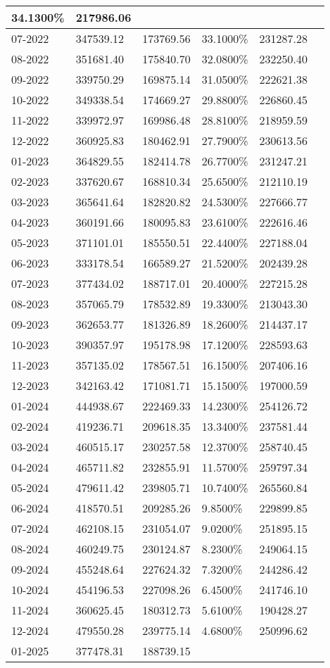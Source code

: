 \documentclass{report}
\begin{document}
\begin{longtable}[c]{|p{1.7cm}|p{2.6cm}|p{2.6cm}|p{2.3cm}|p{2.3cm}|c|}
34.1300\% & 217986.06\\ \hline07-2022 & 347539.12 & 173769.56 & 33.1000\% & 231287.28\\ \hline08-2022 & 351681.40 & 175840.70 & 32.0800\% & 232250.40\\ \hline09-2022 & 339750.29 & 169875.14 & 31.0500\% & 222621.38\\ \hline10-2022 & 349338.54 & 174669.27 & 29.8800\% & 226860.45\\ \hline11-2022 & 339972.97 & 169986.48 & 28.8100\% & 218959.59\\ \hline12-2022 & 360925.83 & 180462.91 & 27.7900\% & 230613.56\\ \hline01-2023 & 364829.55 & 182414.78 & 26.7700\% & 231247.21\\ \hline02-2023 & 337620.67 & 168810.34 & 25.6500\% & 212110.19\\ \hline03-2023 & 365641.64 & 182820.82 & 24.5300\% & 227666.77\\ \hline04-2023 & 360191.66 & 180095.83 & 23.6100\% & 222616.46\\ \hline05-2023 & 371101.01 & 185550.51 & 22.4400\% & 227188.04\\ \hline06-2023 & 333178.54 & 166589.27 & 21.5200\% & 202439.28\\ \hline07-2023 & 377434.02 & 188717.01 & 20.4000\% & 227215.28\\ \hline08-2023 & 357065.79 & 178532.89 & 19.3300\% & 213043.30\\ \hline09-2023 & 362653.77 & 181326.89 & 18.2600\% & 214437.17\\ \hline10-2023 & 390357.97 & 195178.98 & 17.1200\% & 228593.63\\ \hline11-2023 & 357135.02 & 178567.51 & 16.1500\% & 207406.16\\ \hline12-2023 & 342163.42 & 171081.71 & 15.1500\% & 197000.59\\ \hline01-2024 & 444938.67 & 222469.33 & 14.2300\% & 254126.72\\ \hline02-2024 & 419236.71 & 209618.35 & 13.3400\% & 237581.44\\ \hline03-2024 & 460515.17 & 230257.58 & 12.3700\% & 258740.45\\ \hline04-2024 & 465711.82 & 232855.91 & 11.5700\% & 259797.34\\ \hline05-2024 & 479611.42 & 239805.71 & 10.7400\% & 265560.84\\ \hline06-2024 & 418570.51 & 209285.26 & 9.8500\% & 229899.85\\ \hline07-2024 & 462108.15 & 231054.07 & 9.0200\% & 251895.15\\ \hline08-2024 & 460249.75 & 230124.87 & 8.2300\% & 249064.15\\ \hline09-2024 & 455248.64 & 227624.32 & 7.3200\% & 244286.42\\ \hline10-2024 & 454196.53 & 227098.26 & 6.4500\% & 241746.10\\ \hline11-2024 & 360625.45 & 180312.73 & 5.6100\% & 190428.27\\ \hline12-2024 & 479550.28 & 239775.14 & 4.6800\% & 250996.62\\ \hline01-2025 & 377478.31 & 188739.15 & 
\end{longtable}
\end{document}
